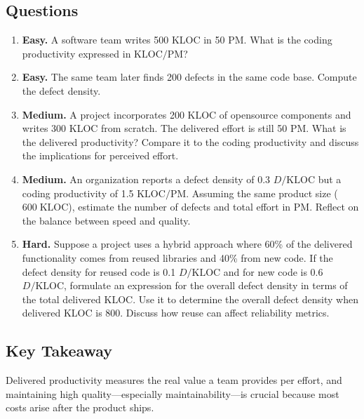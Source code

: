\documentclass[12pt, a4paper]{article}
\begin{document}
\subsection{Questions}
\begin{enumerate}
  \item \textbf{Easy.}  A software team writes 500 KLOC in 50 PM.  What is the coding productivity expressed in \(\text{KLOC}/\text{PM}\)?
  \newpage
  \item \textbf{Easy.}  The same team later finds 200 defects in the same code base.  Compute the defect density.
  \newpage
  \item \textbf{Medium.}  A project incorporates 200 KLOC of opensource components and writes 300 KLOC from scratch.  The delivered effort is still 50 PM.  What is the delivered productivity?  Compare it to the coding productivity and discuss the implications for perceived effort.
  \newpage
  \item \textbf{Medium.}  An organization reports a defect density of 0.3 \(D/\text{KLOC}\) but a coding productivity of 1.5 \(\text{KLOC}/\text{PM}\).  Assuming the same product size (\(600\;\text{KLOC}\)), estimate the number of defects and total effort in PM.  Reflect on the balance between speed and quality.
  \newpage
  \item \textbf{Hard.}  Suppose a project uses a hybrid approach where 60\% of the delivered functionality comes from reused libraries and 40\% from new code.  If the defect density for reused code is 0.1 \(D/\text{KLOC}\) and for new code is 0.6 \(D/\text{KLOC}\), formulate an expression for the overall defect density in terms of the total delivered KLOC.  Use it to determine the overall defect density when delivered KLOC is 800.  Discuss how reuse can affect reliability metrics.
\end{enumerate}

\newpage
\subsection{Key Takeaway}
Delivered productivity measures the real value a team provides per effort, and maintaining high quality---especially maintainability---is crucial because most costs arise after the product ships.

\newpage

\end{document}
